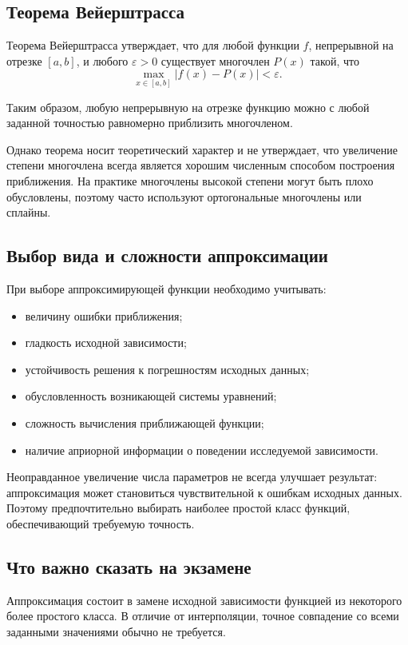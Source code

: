 \subsection{Теорема Вейерштрасса}

Теорема Вейерштрасса утверждает, что для любой функции $f$, непрерывной на отрезке $[a,b]$, и любого $\varepsilon>0$ существует многочлен $P(x)$ такой, что
\[
\max_{x\in[a,b]}|f(x)-P(x)|<\varepsilon.
\]

Таким образом, любую непрерывную на отрезке функцию можно с любой заданной точностью равномерно приблизить многочленом.

Однако теорема носит теоретический характер и не утверждает, что увеличение степени многочлена всегда является хорошим численным способом построения приближения. На практике многочлены высокой степени могут быть плохо обусловлены, поэтому часто используют ортогональные многочлены или сплайны.

\subsection{Выбор вида и сложности аппроксимации}

При выборе аппроксимирующей функции необходимо учитывать:
\begin{itemize}
	\item величину ошибки приближения;
	\item гладкость исходной зависимости;
	\item устойчивость решения к погрешностям исходных данных;
	\item обусловленность возникающей системы уравнений;
	\item сложность вычисления приближающей функции;
	\item наличие априорной информации о поведении исследуемой зависимости.
\end{itemize}

Неоправданное увеличение числа параметров не всегда улучшает результат: аппроксимация может становиться чувствительной к ошибкам исходных данных. Поэтому предпочтительно выбирать наиболее простой класс функций, обеспечивающий требуемую точность.

\subsection{Что важно сказать на экзамене}

Аппроксимация состоит в замене исходной зависимости функцией из некоторого более простого класса. В отличие от интерполяции, точное совпадение со всеми заданными значениями обычно не требуется.

